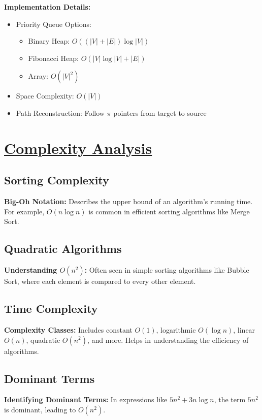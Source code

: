 \textbf{Implementation Details:}
\begin{itemize}[noitemsep]
    \item Priority Queue Options:
        \begin{itemize}[noitemsep]
            \item Binary Heap: $O((|V| + |E|)\log |V|)$
            \item Fibonacci Heap: $O(|V|\log |V| + |E|)$
            \item Array: $O(|V|^2)$
        \end{itemize}
    \item Space Complexity: $O(|V|)$
    \item Path Reconstruction: Follow $\pi$ pointers from target to source
\end{itemize}


\section{\texorpdfstring{\underline{Complexity Analysis}}{Complexity Analysis}}

\subsection{Sorting Complexity}
\textbf{Big-Oh Notation:} Describes the upper bound of an algorithm's running time. For example, $O(n \log n)$ is common in efficient sorting algorithms like Merge Sort.

\subsection{Quadratic Algorithms}
\textbf{Understanding $O(n^2)$:} Often seen in simple sorting algorithms like Bubble Sort, where each element is compared to every other element.

\subsection{Time Complexity}
\textbf{Complexity Classes:} Includes constant $O(1)$, logarithmic $O(\log n)$, linear $O(n)$, quadratic $O(n^2)$, and more. Helps in understanding the efficiency of algorithms.

\subsection{Dominant Terms}
\textbf{Identifying Dominant Terms:} In expressions like $5n^2 + 3n \log n$, the term $5n^2$ is dominant, leading to $O(n^2)$.

